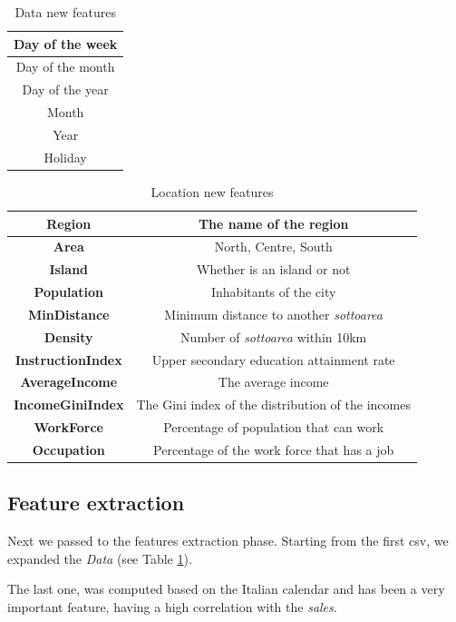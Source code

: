 \documentclass{acm_proc_article-sp}
\begin{document}
\begin{table}
\centering
\begin{tabular}{|c|} \hline
Day of the week\\ \hline
Day of the month\\ \hline
Day of the year\\ \hline
Month\\ \hline
Year\\ \hline
Holiday\\
\hline\end{tabular}
\caption{Data new features}
\label{table:data_new_features}
\end{table}
\begin{table}[h]
\centering
\begin{tabular}{|>{\bfseries}c c|} \hline
Region&The name of the region\\ \hline
Area&North, Centre, South\\ \hline
Island&Whether is an island or not\\ \hline
Population&Inhabitants of the city\\ \hline
MinDistance&Minimum distance to another \textit{sottoarea}\\ \hline
Density&Number of \textit{sottoarea} within 10km\\ \hline
InstructionIndex&Upper secondary education attainment rate\\ \hline
AverageIncome&The average income \\ \hline
IncomeGiniIndex&The Gini index of the distribution of the incomes\\ \hline
WorkForce&Percentage of population that can work\\ \hline
Occupation&Percentage of the work force that has a job\\
\hline\end{tabular}
\caption{Location new features}
\label{table:gps_new_features}
\end{table}

\subsection{Feature extraction}
Next we passed to the features extraction phase.
Starting from the first csv, we expanded the \textit{Data} (see Table \ref{table:data_new_features}).

The last one, was computed based on the Italian calendar and has been a very important feature, having a high correlation with the \textit{sales}.
\end{document}
